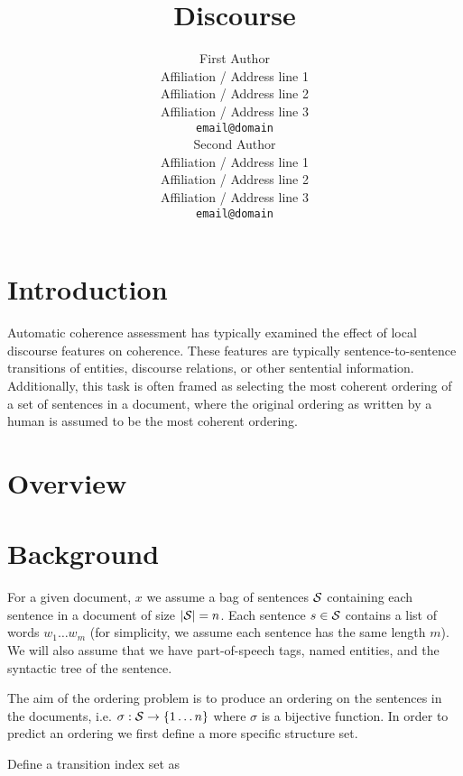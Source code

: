 \documentclass[11pt]{article}
\title{Discourse}
\author{First Author \\
  Affiliation / Address line 1 \\
  Affiliation / Address line 2 \\
  Affiliation / Address line 3 \\
  {\tt email@domain} \\\And
  Second Author \\
  Affiliation / Address line 1 \\
  Affiliation / Address line 2 \\
  Affiliation / Address line 3 \\
  {\tt email@domain} \\}
\date{}
\newcommand{\Sent}{s}
\newcommand{\Sents}{{\cal S}}
\newcommand{\Order}{\sigma}
\newcommand{\Enum}[1]{\{ 1 \ldots #1 \}}
\begin{document}
\maketitle

\begin{abstract}
\end{abstract}

\section{Introduction}

Automatic coherence assessment has typically examined the effect of local discourse features on coherence. These features are typically sentence-to-sentence transitions of entities, discourse relations, or other sentential information. 
Additionally, this task is often framed as selecting the most coherent ordering of a set of sentences in a document, where the original ordering as written by a human is assumed to be the most coherent ordering.


\section{Overview}




\section{Background}


For a given document, $x$ we assume  a bag of sentences $\Sents$ containing each sentence in a
document of size $|\Sents| = n$.  Each sentence $\Sent \in \Sents$
contains a list of words $w_1 \ldots w_m$ (for simplicity, we assume each sentence has the same length $m$). We will also assume that we
have part-of-speech tags, named entities, and the syntactic tree of
the sentence.


The aim of the ordering problem is to produce an ordering on the sentences in the documents, i.e. $\Order : \Sents \rightarrow \Enum{n}$ where $\Order$ is a bijective function. In order to predict an ordering we first define a more specific structure set.  

Define a transition index set as 
\end{document}
